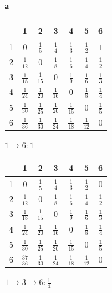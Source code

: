 \documentclass[russian]{article}
\begin{document}
\paragraph*{а}

\begin{tabular}{|c|c|c|c|c|c|c|}\hline
& 1& 2& 3& 4& 5& 6\\\hline
1& $0$& $\frac{1}{5}$& $\frac{1}{4}$& $\frac{1}{3}$& $\frac{1}{2}$& $1$\\\hline
2& $\frac{1}{12}$& $0$& $\frac{1}{8}$& $\frac{1}{6}$& $\frac{1}{4}$& $\frac{1}{2}$\\\hline
3& $\frac{1}{18}$& $\frac{1}{15}$& $0$& $\frac{1}{9}$& $\frac{1}{6}$& $\frac{1}{3}$\\\hline
4& $\frac{1}{24}$& $\frac{1}{20}$& $\frac{1}{16}$& $0$& $\frac{1}{8}$& $\frac{1}{4}$\\\hline
5& $\frac{1}{30}$& $\frac{1}{25}$& $\frac{1}{20}$& $\frac{1}{15}$& $0$& $\frac{1}{5}$\\\hline
6& $\frac{1}{36}$& $\frac{1}{30}$& $\frac{1}{24}$& $\frac{1}{18}$& $\frac{1}{12}$& $0$\\\hline
\end{tabular}

$ 1 \to 6 : 1$

\begin{tabular}{|c|c|c|c|c|c|c|}\hline
& 1& 2& 3& 4& 5& 6\\\hline
1& $0$& $\frac{1}{5}$& $\frac{1}{4}$& $\frac{1}{3}$& $\frac{1}{2}$& $0$\\\hline
2& $\frac{1}{12}$& $0$& $\frac{1}{8}$& $\frac{1}{6}$& $\frac{1}{4}$& $\frac{1}{2}$\\\hline
3& $\frac{1}{18}$& $\frac{1}{15}$& $0$& $\frac{1}{9}$& $\frac{1}{6}$& $\frac{1}{3}$\\\hline
4& $\frac{1}{24}$& $\frac{1}{20}$& $\frac{1}{16}$& $0$& $\frac{1}{8}$& $\frac{1}{4}$\\\hline
5& $\frac{1}{30}$& $\frac{1}{25}$& $\frac{1}{20}$& $\frac{1}{15}$& $0$& $\frac{1}{5}$\\\hline
6& $\frac{37}{36}$& $\frac{1}{30}$& $\frac{1}{24}$& $\frac{1}{18}$& $\frac{1}{12}$& $0$\\\hline
\end{tabular}

$ 1 \to 3 \to 6 : \frac{1}{4}$
\end{document}
